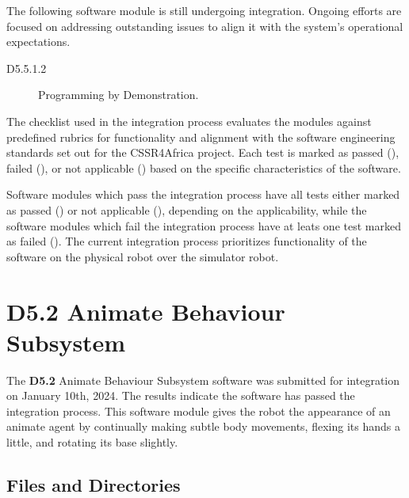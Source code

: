 \documentclass{CSSRforAfrica}
\newcommand{\checkboxChecked}{\fbox{\ding{51}}} %
\newcommand{\checkboxCrossed}{\fbox{\ding{55}}} %
\newcommand{\checkboxDashed}{\fbox{--}}         %
\begin{document}
\noindent The following software module is still undergoing integration. Ongoing efforts are focused on addressing outstanding issues to align it with the system's operational expectations.
\begin{description}
     \item[D5.5.1.2] Programming by Demonstration.
\end{description}


\noindent The checklist used in the integration process evaluates the modules against predefined rubrics for functionality and alignment with the software engineering standards set out for the CSSR4Africa project. Each test is marked as passed (\checkboxChecked), failed (\checkboxCrossed), or not applicable (\checkboxDashed) based on the specific characteristics of the software. 

\noindent Software modules which pass the integration process have all tests either marked as passed (\checkboxChecked) or not applicable (\checkboxDashed), depending on the applicability, while the software modules which fail the integration process have at leats one test  marked as failed (\checkboxCrossed).  The current integration process prioritizes functionality of the software on the physical robot over the simulator robot.


\newpage
 
 
\pagebreak
\tableofcontents
\newpage



\section{D5.2 Animate Behaviour Subsystem} 
\label{section:animate_behaviour}
The \textbf{D5.2} Animate Behaviour Subsystem software was submitted for integration on January 10th, 2024. The results indicate the software has passed the integration process. This software module gives the robot the appearance of an animate agent by continually making subtle body movements, flexing its hands a little, and rotating its base slightly.

\subsection{Files and Directories}
 
\end{document}

